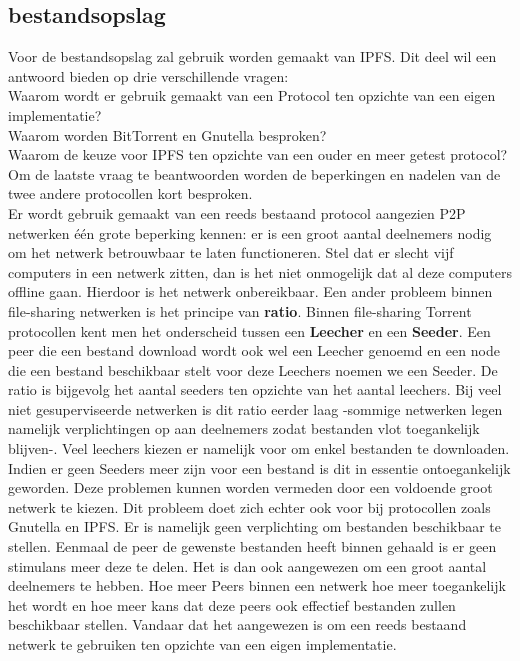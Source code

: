\subsection{bestandsopslag}
Voor de bestandsopslag zal gebruik worden gemaakt van IPFS. Dit deel wil een antwoord bieden op drie verschillende vragen:\\
Waarom wordt er gebruik gemaakt van een Protocol ten opzichte van een eigen implementatie?\\
Waarom worden BitTorrent en Gnutella besproken? 
\\Waarom de keuze voor IPFS ten opzichte van een ouder en meer getest protocol? Om de laatste vraag te beantwoorden worden de beperkingen en nadelen van de twee andere protocollen kort besproken.\\

Er wordt gebruik gemaakt van een reeds bestaand protocol aangezien P2P netwerken één grote beperking kennen: er is een groot aantal deelnemers nodig om het netwerk betrouwbaar te laten functioneren. Stel dat er slecht vijf computers in een netwerk zitten, dan is het niet onmogelijk dat al deze computers offline gaan. Hierdoor is het netwerk onbereikbaar. Een ander probleem binnen file-sharing netwerken is het principe van \textbf{ratio}. Binnen file-sharing Torrent protocollen kent men het onderscheid tussen een \textbf{Leecher} en een \textbf{Seeder}. Een peer die een bestand download wordt ook wel een Leecher genoemd en een node die een bestand beschikbaar stelt voor deze Leechers noemen we een Seeder. De ratio is bijgevolg het aantal seeders ten opzichte van het aantal leechers. Bij veel niet gesuperviseerde netwerken is dit ratio eerder laag -sommige netwerken legen namelijk verplichtingen op aan deelnemers zodat bestanden vlot toegankelijk blijven-. Veel leechers kiezen er namelijk voor om enkel bestanden te downloaden. Indien er geen Seeders meer zijn voor een bestand is dit in essentie ontoegankelijk geworden. Deze problemen kunnen worden vermeden door een voldoende groot netwerk te kiezen. Dit probleem doet zich echter ook voor bij protocollen zoals Gnutella en IPFS. Er is namelijk geen verplichting om bestanden beschikbaar te stellen. Eenmaal de peer de gewenste bestanden heeft binnen gehaald is er geen stimulans meer deze te delen. Het is dan ook aangewezen om een groot aantal deelnemers te hebben. Hoe meer Peers binnen een netwerk hoe meer toegankelijk het wordt en hoe meer kans dat deze peers ook effectief bestanden zullen beschikbaar stellen. Vandaar dat het aangewezen is om een reeds bestaand netwerk te gebruiken ten opzichte van een eigen implementatie.\\

